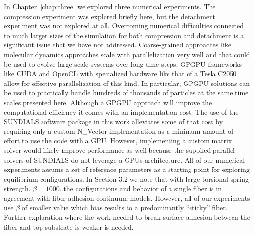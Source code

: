 In Chapter~\ref{chap:three} we explored three numerical experiments.
The compression experiment was explored briefly here, but the detachment experiment was not explored at all.
Overcoming numerical difficulties connected to much larger sizes of the simulation for both compression and detachment is a significant issue that we have not addressed.
Coarse-grained approaches like molecular dynamics approaches scale with parallelization very well and that could be used to evolve large scale systems over long time steps.
GPGPU frameworks like CUDA and OpenCL with specialized hardware like that of a Tesla C2050 allow for effective parallelization of this kind.
In particular, GPGPU solutions can be used to practically handle hundreds of thousands of particles at the same time scales presented here.
Although a GPGPU approach will improve the computational efficiency it comes with an implementation cost.
The use of the SUNDIALS software package in this work alleviates some of that cost by requiring only a custom N\_Vector implementation as a minimum amount of effort to use the code with a GPU.
However, implementing a custom matrix solver would likely improve performance as well because the supplied parallel solvers of SUNDIALS do not leverage a GPUs architecture.
All of our numerical experiments assume a set of reference parameters as a starting point for exploring equilibrium configurations.
In Section 3.2 we note that with large torsional spring strength, $\beta = 1000$, the configurations and behavior of a single fiber is in agreement with fiber adhesion continuum models.
However, all of our experiments use $\beta$ of smaller value which bias results to a predominantly ``sticky'' fiber.
Further exploration where the work needed to break surface adhesion between the fiber and top substrate is weaker is needed.
